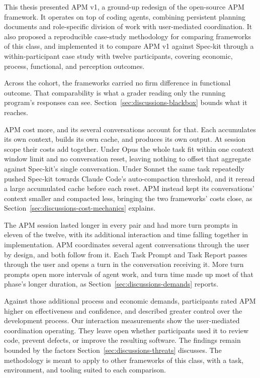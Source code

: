 
This thesis presented APM v1, a ground-up redesign of the open-source APM framework. It operates on top of coding agents, combining persistent planning documents and role-specific division of work with user-mediated coordination. It also proposed a reproducible case-study methodology for comparing frameworks of this class, and implemented it to compare APM v1 against Spec-kit through a within-participant case study with twelve participants, covering economic, process, functional, and perception outcomes.

Across the cohort, the frameworks carried no firm difference in functional outcome. That comparability is what a grader reading only the running program's responses can see. Section~\ref{sec:discussions-blackbox} bounds what it reaches.

APM cost more, and its several conversations account for that. Each accumulates its own context, builds its own cache, and produces its own output. At session scope their costs add together. Under Opus the whole task fit within one context window limit and no conversation reset, leaving nothing to offset that aggregate against Spec-kit's single conversation. Under Sonnet the same task repeatedly pushed Spec-kit towards Claude Code's auto-compaction threshold, and it reread a large accumulated cache before each reset. APM instead kept its conversations' context smaller and compacted less, bringing the two frameworks' costs close, as Section~\ref{sec:discussions-cost-mechanics} explains.

The APM session lasted longer in every pair and had more turn prompts in eleven of the twelve, with its additional interaction and time falling together in implementation. APM coordinates several agent conversations through the user by design, and both follow from it. Each Task Prompt and Task Report passes through the user and opens a turn in the conversation receiving it. More turn prompts open more intervals of agent work, and turn time made up most of that phase's longer duration, as Section~\ref{sec:discussions-demands} reports.

Against those additional process and economic demands, participants rated APM higher on effectiveness and confidence, and described greater control over the development process. Our interaction measurements show the user-mediated coordination operating. They leave open whether participants used it to review code, prevent defects, or improve the resulting software. The findings remain bounded by the factors Section~\ref{sec:discussions-threats} discusses. The methodology is meant to apply to other frameworks of this class, with a task, environment, and tooling suited to each comparison.

